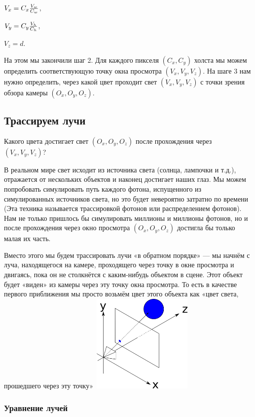 $V_x = C_x {V_w \over C_w}$,

$V_y = C_y {V_h \over C_h}$,

$V_z = d$.

На этом мы закончили шаг 2. Для каждого пикселя $(C_x, C_y)$ холста мы можем определить соответствующую точку окна просмотра $(V_x, V_y, V_z)$. На шаге 3 нам нужно определить, через какой цвет проходит свет $(V_x, V_y, V_z)$ с точки зрения обзора камеры $(O_x, O_y, O_z)$.

\subsection{Трассируем лучи}\label{1}
Какого цвета достигает свет $(O_x, O_y, O_z)$ после прохождения через $(V_x, V_y, V_z)$?

В реальном мире свет исходит из источника света (солнца, лампочки и т.д.), отражается от нескольких объектов и наконец достигает наших глаз. Мы можем попробовать симулировать путь каждого фотона, испущенного из симулированных источников света, но это будет невероятно затратно по времени (Эта техника называется трассировкой фотонов или распределением фотонов). Нам не только пришлось бы симулировать миллионы и миллионы фотонов, но и после прохождения через окно просмотра $(O_x, O_y, O_z)$ достигла бы только малая их часть.

Вместо этого мы будем трассировать лучи «в обратном порядке» — мы начнём с луча, находящегося на камере, проходящего через точку в окне просмотра и двигаясь, пока он не столкнётся с каким-нибудь объектом в сцене. Этот объект будет «виден» из камеры через эту точку окна просмотра. То есть в качестве первого приближения мы просто возьмём цвет этого объекта как «цвет света, прошедшего через эту точку»
\includegraphics[width=5cm, height=4.8cm]{sphere_and_view.png}
\newpage
\subsubsection{Уравнение лучей}\label{2}

